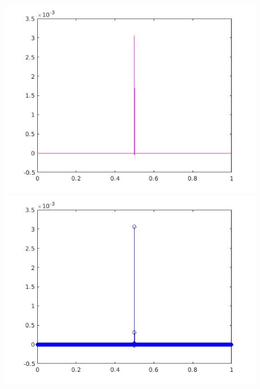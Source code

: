 \documentclass[a4paper,11pt]{article}
\begin{document}
\begin{figure}[!hp]
\centering
\begin{minipage}{.5\textwidth}
  \centering
  \includegraphics[width=1\linewidth]{images/lab2_29.jpg}
\end{minipage}%
\begin{minipage}{.5\textwidth}
  \centering
  \includegraphics[width=1\linewidth]{images/lab2_30.jpg}
\end{minipage}
\end{figure}
\end{document}
